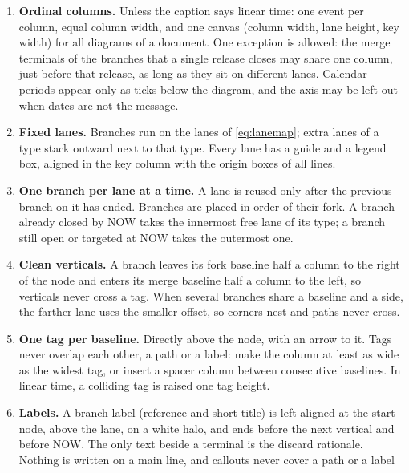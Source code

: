 \begin{enumerate}[label=\textbf{L\arabic*},ref=L\arabic*,leftmargin=*,
    itemsep=2pt,topsep=3pt]
  \item \label{lay:ordinal}\textbf{Ordinal columns.} Unless the caption
        says linear time: one event per column, equal column width, and one
        canvas (column width, lane height, key width) for all diagrams of a
        document. One exception is allowed: the merge terminals of the
        branches that a single release closes may share one column, just
        before that release, as long as they sit on different lanes. Calendar periods appear only as ticks below the diagram,
        and the axis may be left out when dates are not the message.
  \item \label{lay:lanes}\textbf{Fixed lanes.} Branches run on the lanes
        of \cref{eq:lanemap}; extra lanes of a type stack outward next to
        that type. Every lane has a guide and a legend box, aligned in the
        key column with the origin boxes of all lines.
  \item \label{lay:onelane}\textbf{One branch per lane at a time.} A lane
        is reused only after the previous branch on it has ended. Branches
        are placed in order of their fork. A branch already closed by NOW
        takes the innermost free lane of its type; a branch still open or
        targeted at NOW takes the outermost one.
  \item \label{lay:fork}\textbf{Clean verticals.} A branch leaves its fork
        baseline half a column to the right of the node and enters its
        merge baseline half a column to the left, so verticals never cross
        a tag. When several branches share a baseline and a side, the
        farther lane uses the smaller offset, so corners nest and paths
        never cross.
  \item \label{lay:tags}\textbf{One tag per baseline.} Directly above the
        node, with an arrow to it. Tags never overlap each other, a path or
        a label: make the column at least as wide as the widest tag, or
        insert a spacer column between consecutive baselines. In linear
        time, a colliding tag is raised one tag height.
  \item \label{lay:labels}\textbf{Labels.} A branch label (reference and
        short title) is left-aligned at the start node, above the lane, on
        a white halo, and ends before the next vertical and before NOW. The
        only text beside a terminal is the discard rationale. Nothing is
        written on a main line, and callouts never cover a path or a label

\end{enumerate}
